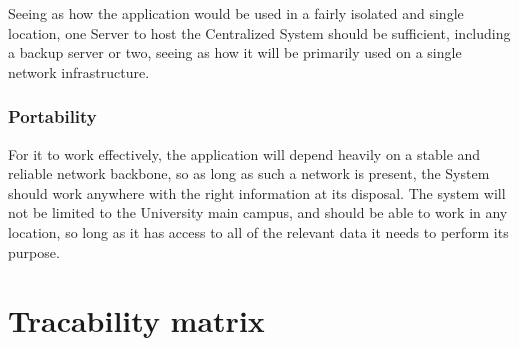 \documentclass[12pt]{article}
\begin{document}
		

		Seeing as how the application would be used in a fairly isolated and single location, one Server to host the Centralized System should be sufficient, including a backup server or two, seeing as how it will be primarily used on a single network infrastructure.  

		

		\subsubsection{Portability}

		For it to work effectively, the application will depend heavily on a stable and reliable network backbone, so as long as such a network is present, the System should work anywhere with the right information at its disposal.  The system will not be limited to the University main campus, and should be able to work in any location, so long as it has access to all of the relevant data it needs to perform its purpose.  

		
\section{Tracability matrix}
\end{document}
